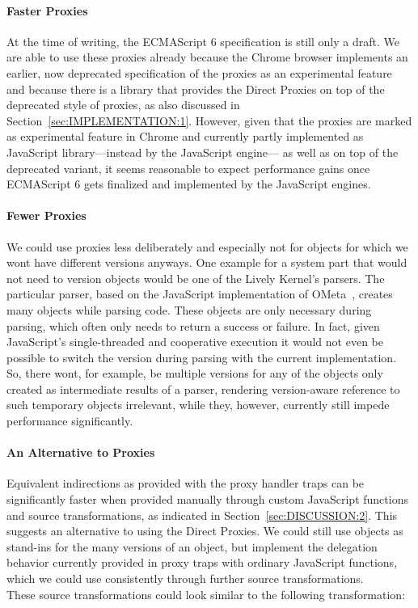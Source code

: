 \paragraph{Faster Proxies}
At the time of writing, the ECMAScript 6 specification is still only a draft.
We are able to use these proxies already because the Chrome browser implements an earlier, now deprecated specification of the proxies as an experimental feature and because there is a library that provides the Direct Proxies on top of the deprecated style of proxies, as also discussed in Section~\ref{sec:IMPLEMENTATION:1}.
However, given that the proxies are marked as experimental feature in Chrome and currently partly implemented as JavaScript library---instead by the JavaScript engine--- as well as on top of the deprecated variant, it seems reasonable to expect performance gains once ECMAScript 6 gets finalized and implemented by the JavaScript engines.

\paragraph{Fewer Proxies}
We could use proxies less deliberately and especially not for objects for which we wont have different versions anyways.
One example for a system part that would not need to version objects would be one of the Lively Kernel's parsers.
The particular parser, based on the JavaScript implementation of OMeta~\cite{Warth2007OOL}, creates many objects while parsing code.
These objects are only necessary during parsing, which often only needs to return a success or failure.
In fact, given JavaScript's single-threaded and cooperative execution it would not even be possible to switch the version during parsing with the current implementation.
So, there wont, for example, be multiple versions for any of the objects only created as intermediate results of a parser, rendering version-aware reference to such temporary objects irrelevant, while they, however, currently still impede performance significantly.

\paragraph{An Alternative to Proxies}
Equivalent indirections as provided with the proxy handler traps can be significantly faster when provided manually through custom JavaScript functions and source transformations, as indicated in Section~\ref{sec:DISCUSSION:2}.
This suggests an alternative to using the Direct Proxies.
We could still use objects as stand-ins for the many versions of an object, but implement the delegation behavior currently provided in proxy traps with ordinary JavaScript functions, which we could use consistently through further source transformations.\\
These source transformations could look similar to the following transformation:

